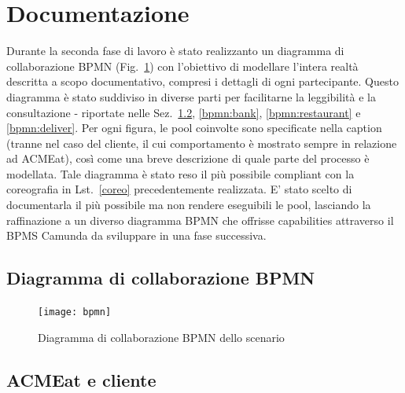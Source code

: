 \documentclass[11pt]{article} %
\begin{document}
\clearpage

\section{Documentazione}
\label{sez:documentazione}

Durante la seconda fase di lavoro è stato realizzanto un diagramma di collaborazione BPMN (Fig.~\ref{bpmn}) con l'obiettivo di modellare l'intera realtà descritta a scopo documentativo, compresi i dettagli di ogni partecipante. Questo diagramma è stato suddiviso in diverse parti per facilitarne la leggibilità e la consultazione - riportate nelle Sez.~\ref{bpmn:acmeat}, \ref{bpmn:bank}, \ref{bpmn:restaurant} e \ref{bpmn:deliver}. Per ogni figura, le pool coinvolte sono specificate nella caption (tranne nel caso del cliente, il cui comportamento è mostrato sempre in relazione ad ACMEat), così come una breve descrizione di quale parte del processo è modellata. Tale diagramma è stato reso il più possibile compliant con la coreografia in Lst.~\ref{coreo} precedentemente realizzata. E' stato scelto di documentarla il più possibile ma non rendere eseguibili le pool, lasciando la raffinazione a un diverso diagramma BPMN che offrisse capabilities attraverso il BPMS Camunda da sviluppare in una fase successiva.

\subsection{Diagramma di collaborazione BPMN}

\begin{figure}[H]
\texttt{[image: bpmn]}
\caption{Diagramma di collaborazione BPMN dello scenario}
\label{bpmn}
\end{figure}

\clearpage

\subsection{ACMEat e cliente}
\label{bpmn:acmeat}
\end{document}
